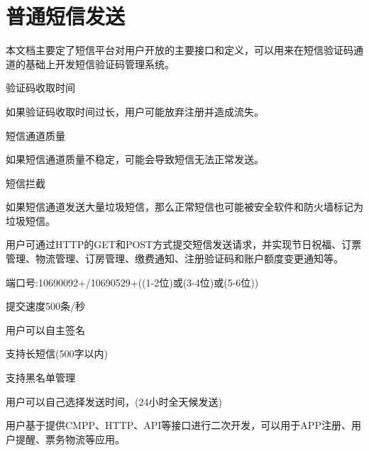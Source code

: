 \documentclass[11pt]{book} %
\begin{document}
\chapter{普通短信发送}


本文档主要定了短信平台对用户开放的主要接口和定义，可以用来在短信验证码通道的基础上开发短信验证码管理系统。

\begin{compactitem}
\item 验证码收取时间

如果验证码收取时间过长，用户可能放弃注册并造成流失。

\item 短信通道质量

如果短信通道质量不稳定，可能会导致短信无法正常发送。

\item 短信拦截

如果短信通道发送大量垃圾短信，那么正常短信也可能被安全软件和防火墙标记为垃圾短信。

\end{compactitem}

用户可通过HTTP的GET和POST方式提交短信发送请求，并实现节日祝福、订票管理、物流管理、订房管理、缴费通知、注册验证码和账户额度变更通知等。

\begin{compactitem}
\item 端口号:10690092+/10690529+((1-2位)或(3-4位)或(5-6位))
\item 提交速度500条/秒
\item 用户可以自主签名
\item 支持长短信(500字以内)
\item 支持黑名单管理
\item 用户可以自己选择发送时间，(24小时全天候发送)
\end{compactitem}

用户基于提供CMPP、HTTP、API等接口进行二次开发，可以用于APP注册、用户提醒、票务物流等应用。
\end{document}
